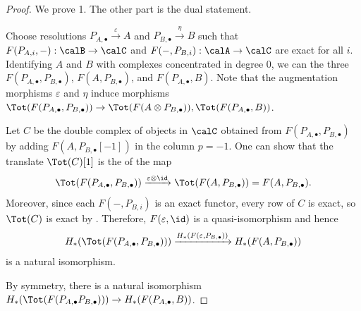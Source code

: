 \begin{proof}
    We prove 1. The other part is the dual statement.

    Choose resolutions $P_{A,\bullet} \xrightarrow{\varepsilon} A$ and $P_{B,\bullet} \xrightarrow{\eta} B$ such that $F(P_{A,i}, -): \calB \to \calC$ and $F(-, P_{B,i}): \calA \to \calC$ are exact for all $i$. 
    Identifying $A$ and $B$ with complexes concentrated in degree $0$, we can  the three  $F(P_{A,\bullet}, P_{B,\bullet})$, $F(A, P_{B,\bullet})$, and $F(P_{A,\bullet} , B)$. Note that the augmentation morphisms $\varepsilon$ and $\eta$ induce morphisms $\Tot(F(P_{A,\bullet}, P_{B,\bullet})) \to \Tot(F(A \otimes P_{B,\bullet})), \Tot(F(P_{A,\bullet}, B))$.

    Let $C$ be the double complex of objects in $\calC$ obtained from $F(P_{A,\bullet}, P_{B,\bullet})$ by adding $F(A, P_{B,\bullet}[-1])$ in the column $p = -1$. One can show that the translate $\Tot(C)[1]$ is the  of the map 
    $$\Tot(F(P_{A,\bullet}, P_{B,\bullet})) \xrightarrow{\varepsilon \otimes \id} \Tot(F(A, P_{B,\bullet})) = F(A, P_{B,\bullet}).$$
    Moreover, since each $F(-, P_{B,i})$ is an exact functor, every row of $C$ is exact, so $\Tot(C)$ is exact by . Therefore, $F(\varepsilon, \id)$ is a quasi-isomorphism and hence 
    $$H_*(\Tot(F(P_{A,\bullet}, P_{B,\bullet}))) \xrightarrow{H_*(F(\varepsilon, P_{B,\bullet}))} H_*(F(A, P_{B,\bullet}))$$
    is a natural isomorphism. 

    By symmetry, there is a natural isomorphism $H_*(\Tot(F(P_{A,\bullet} P_{B,\bullet}))) \xrightarrow{} H_*(F(P_{A,\bullet}, B))$.
\end{proof}
